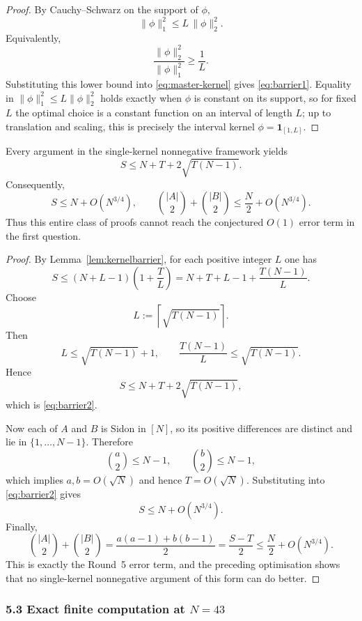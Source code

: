 \begin{proof}
By Cauchy--Schwarz on the support of $\phi$,
\[
\|\phi\|_1^2\le L\,\|\phi\|_2^2.
\]
Equivalently,
\[
\frac{\|\phi\|_2^2}{\|\phi\|_1^2}\ge \frac1L.
\]
Substituting this lower bound into \eqref{eq:master-kernel} gives \eqref{eq:barrier1}.  Equality in $\|\phi\|_1^2\le L\|\phi\|_2^2$ holds exactly when $\phi$ is constant on its support, so for fixed $L$ the optimal choice is a constant function on an interval of length $L$; up to translation and scaling, this is precisely the interval kernel $\phi=\mathbf 1_{[1,L]}$.
\end{proof}

\begin{theorem}
\label{thm:barrier}
Every argument in the single-kernel nonnegative framework yields
\begin{equation}
\label{eq:barrier2}
S\le N+T+2\sqrt{T(N-1)}.
\end{equation}
Consequently,
\begin{equation}
\label{eq:barrier3}
S\le N+O(N^{3/4}),
\qquad
\binom{|A|}{2}+\binom{|B|}{2}\le \frac N2+O(N^{3/4}).
\end{equation}
Thus this entire class of proofs cannot reach the conjectured $O(1)$ error term in the first question.
\end{theorem}

\begin{proof}
By Lemma~\ref{lem:kernelbarrier}, for each positive integer $L$ one has
\[
S\le (N+L-1)\left(1+\frac{T}{L}\right)
= N+T+L-1+\frac{T(N-1)}{L}.
\]
Choose
\[
L:=\left\lceil\sqrt{T(N-1)}\right\rceil.
\]
Then
\[
L\le \sqrt{T(N-1)}+1,
\qquad
\frac{T(N-1)}{L}\le \sqrt{T(N-1)}.
\]
Hence
\[
S\le N+T+2\sqrt{T(N-1)},
\]
which is \eqref{eq:barrier2}.

Now each of $A$ and $B$ is Sidon in $[N]$, so its positive differences are distinct and lie in $\{1,\dots,N-1\}$.  Therefore
\[
\binom{a}{2}\le N-1,
\qquad
\binom{b}{2}\le N-1,
\]
which implies $a,b=O(\sqrt N)$ and hence $T=O(\sqrt N)$.  Substituting into \eqref{eq:barrier2} gives
\[
S\le N+O(N^{3/4}).
\]
Finally,
\[
\binom{|A|}{2}+\binom{|B|}{2}
=\frac{a(a-1)+b(b-1)}{2}
=\frac{S-T}{2}
\le \frac N2+O(N^{3/4}).
\]
This is exactly the Round~5 error term, and the preceding optimisation shows that no single-kernel nonnegative argument of this form can do better.
\end{proof}

\subsubsection{5.3 Exact finite computation at \texorpdfstring{$N=43$}{N=43}}


